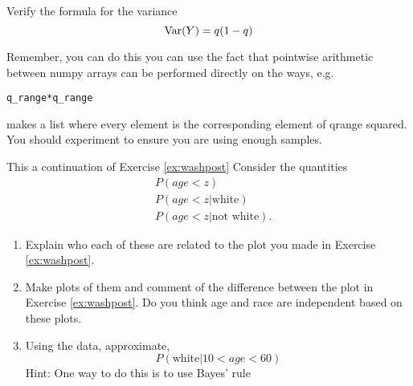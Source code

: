 \begin{exercise}
Verify the formula for the variance
\begin{equation*}
{\rm Var}(Y) = q(1-q)
\end{equation*}

Remember, you can do this you can use the fact that pointwise arithmetic between numpy arrays can be performed directly on the ways, e.g.
\begin{Verbatim}
q_range*q_range
\end{Verbatim}
makes a list where every element is the corresponding element of qrange squared. You should experiment to ensure you are using enough samples.
\end{exercise}

\begin{exercise}

This a continuation of Exercise \ref{ex:washpost}
Consider the quantities
\begin{align*}
&P(age <z)\\
&P(age <z|\text{white})\\
&P(age <z|\text{not white}).
\end{align*}
\begin{enumerate}[label=(\alph*)]
\item Explain who each of these are related to the plot you made in Exercise \ref{ex:washpost}. 
\item Make plots of them and comment of the difference between the plot in Exercise \ref{ex:washpost}. Do you think age and race are independent based on these plots. 
\item Using the data, approximate, 
\begin{equation*}
P(\text{white}| 10<age<60)
\end{equation*}
Hint: One way to do this is to use Bayes' rule 
\end{enumerate}

\end{exercise}


